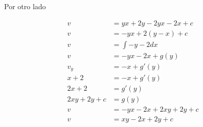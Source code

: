 \documentclass[12pt]{exam}
\begin{document}
Por otro lado

\begin{align*}
  v &= yx + 2y -2yx - 2x + c\\
  v &= -yx + 2(y - x) + c\\
  v &= \int -y - 2 dx \\
  v &= -yx - 2x + g(y)\\
  v_y &= -x + g'(y)\\
  x + 2 &= -x + g'(y)\\
  2x + 2 &= g'(y)\\
  2xy + 2y + c &= g(y)\\
  v &= -yx - 2x + 2xy + 2y + c\\
  v &= xy - 2x + 2y + c
\end{align*}
\end{document}

